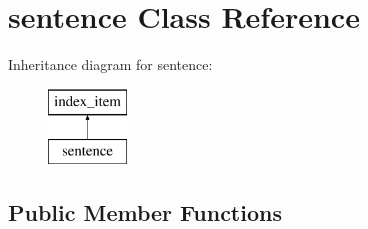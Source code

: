 \hypertarget{classsentence}{}\section{sentence Class Reference}
\label{classsentence}
Inheritance diagram for sentence\+:\begin{figure}[H]
\begin{center}
\leavevmode
\includegraphics[height=2.000000cm]{classsentence}
\end{center}
\end{figure}
\subsection*{Public Member Functions}
